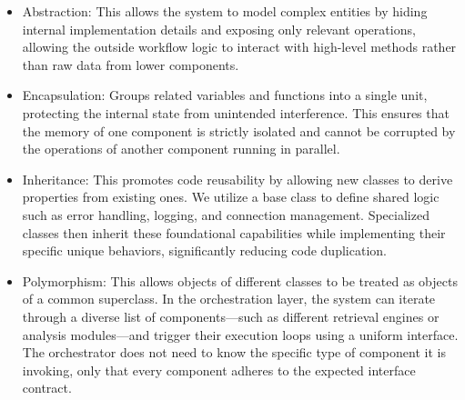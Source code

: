 \begin{itemize}
    \item Abstraction: This allows the system to model complex entities by hiding internal implementation details and exposing only relevant operations, allowing the outside workflow logic to interact with high-level methods rather than raw data from lower components.
    
    \item Encapsulation: Groups related variables and functions into a single unit, protecting the internal state from unintended interference. This ensures that the memory of one component is strictly isolated and cannot be corrupted by the operations of another component running in parallel.

    \item Inheritance: This promotes code reusability by allowing new classes to derive properties from existing ones. We utilize a base class to define shared logic such as error handling, logging, and connection management. Specialized classes then inherit these foundational capabilities while implementing their specific unique behaviors, significantly reducing code duplication.

    \item Polymorphism: This allows objects of different classes to be treated as objects of a common superclass. In the orchestration layer, the system can iterate through a diverse list of components—such as different retrieval engines or analysis modules—and trigger their execution loops using a uniform interface. The orchestrator does not need to know the specific type of component it is invoking, only that every component adheres to the expected interface contract.
\end{itemize}

